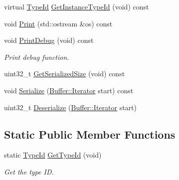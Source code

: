 \begin{DoxyCompactItemize}
virtual \hyperlink{classns3_1_1TypeId}{Type\+Id} \hyperlink{classns3_1_1RngReq_a25ed9da7b837249a488193188a66ddf8}{Get\+Instance\+Type\+Id} (void) const 
\item 
void \hyperlink{classns3_1_1RngReq_adfc1caea1d34241796763e7dc8570fe0}{Print} (std\+::ostream \&os) const 
\item 
void \hyperlink{classns3_1_1RngReq_a8f7405d1dafe1943d45913ec8a8f9a37}{Print\+Debug} (void) const 
\begin{DoxyCompactList}\small\item\em Print debug function. \end{DoxyCompactList}\item 
uint32\+\_\+t \hyperlink{classns3_1_1RngReq_a09d65e6923aa3e96b115d5a951c003e0}{Get\+Serialized\+Size} (void) const 
\item 
void \hyperlink{classns3_1_1RngReq_aa5ab8cb216889ad2c08b8fd8c0a6943c}{Serialize} (\hyperlink{classns3_1_1Buffer_1_1Iterator}{Buffer\+::\+Iterator} start) const 
\item 
uint32\+\_\+t \hyperlink{classns3_1_1RngReq_ae7a6403ad1dfb0463182916ff9da486d}{Deserialize} (\hyperlink{classns3_1_1Buffer_1_1Iterator}{Buffer\+::\+Iterator} start)
\end{DoxyCompactItemize}
\subsection*{Static Public Member Functions}
\begin{DoxyCompactItemize}
\item 
static \hyperlink{classns3_1_1TypeId}{Type\+Id} \hyperlink{classns3_1_1RngReq_a3ee249094388960d04b14b1f8ff6dc53}{Get\+Type\+Id} (void)
\begin{DoxyCompactList}\small\item\em Get the type ID. \end{DoxyCompactList}\end{DoxyCompactItemize}
